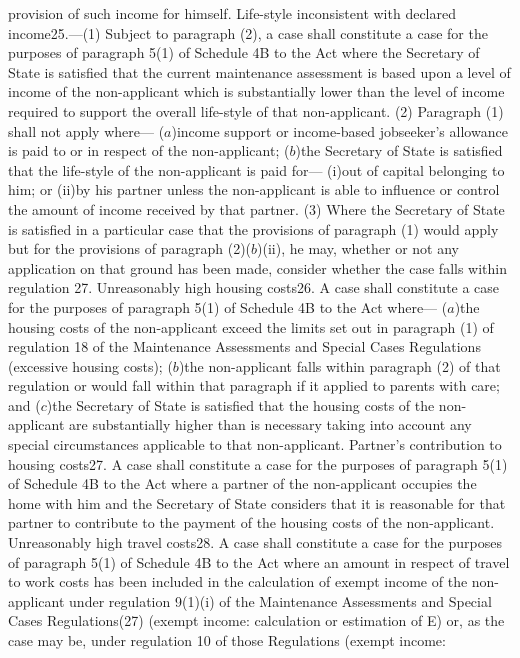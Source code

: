\documentclass[a4paper]{article}
\begin{document}
provision of such income for himself.
Life-style inconsistent with declared income25.—(1) Subject to paragraph (2), a
case shall constitute a case for the purposes of paragraph 5(1) of Schedule 4B
to the Act where the Secretary of State is satisfied that the current
maintenance assessment is based upon a level of income of the non-applicant
which is substantially lower than the level of income required to support the
overall life-style of that non-applicant.
(2) Paragraph (1) shall not apply where—
($a$)income support or income-based jobseeker’s allowance is paid to or in respect
of the non-applicant;
($b$)the Secretary of State is satisfied that the life-style of the non-applicant
is paid for—
(i)out of capital belonging to him; or
(ii)by his partner unless the non-applicant is able to influence or control the
amount of income received by that partner.
(3) Where the Secretary of State is satisfied in a particular case that the
provisions of paragraph (1) would apply but for the provisions of paragraph
(2)($b$)(ii), he may, whether or not any application on that ground has been made,
consider whether the case falls within regulation 27.
Unreasonably high housing costs26. A case shall constitute a case for the
purposes of paragraph 5(1) of Schedule 4B to the Act where—
($a$)the housing costs of the non-applicant exceed the limits set out in paragraph
(1) of regulation 18 of the Maintenance Assessments and Special Cases
Regulations (excessive housing costs);
($b$)the non-applicant falls within paragraph (2) of that regulation or would fall
within that paragraph if it applied to parents with care; and
($c$)the Secretary of State is satisfied that the housing costs of the
non-applicant are substantially higher than is necessary taking into account any
special circumstances applicable to that non-applicant.
Partner’s contribution to housing costs27. A case shall constitute a case for
the purposes of paragraph 5(1) of Schedule 4B to the Act where a partner of the
non-applicant occupies the home with him and the Secretary of State considers
that it is reasonable for that partner to contribute to the payment of the
housing costs of the non-applicant.
Unreasonably high travel costs28. A case shall constitute a case for the
purposes of paragraph 5(1) of Schedule 4B to the Act where an amount in respect
of travel to work costs has been included in the calculation of exempt income of
the non-applicant under regulation 9(1)(i) of the Maintenance Assessments and
Special Cases Regulations(27) (exempt income: calculation or estimation of E)
or, as the case may be, under regulation 10 of those Regulations (exempt income:
\end{document}
